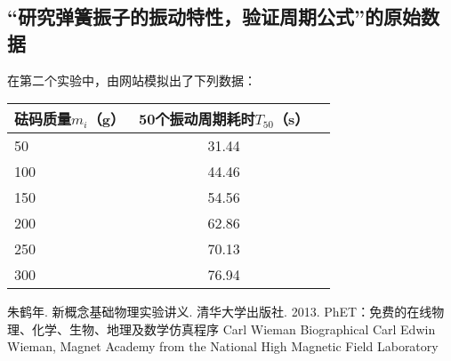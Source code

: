 \documentclass[UTF8]{ctexart}
\begin{document}
\subsection{“研究弹簧振子的振动特性，验证周期公式”的原始数据}
在第二个实验中，由网站模拟出了下列数据：
\begin{table}[htbp!] 
\centering 
\begin{tabular}{|l|c|r|} 
\hline 
 砝码质量$m_i$（g） &  50个振动周期耗时$T_{50}$（s）  \\ 
\hline 
 50 & 31.44 \\ 
\hline 
 100 & 44.46 \\ 
\hline 
 150 & 54.56  \\ 
\hline 
 200 & 62.86  \\ 
\hline 
 250 & 70.13 \\ 
\hline 
 300 & 76.94  \\ 
\hline
\end{tabular} 
\end{table}
\begin{thebibliography}{123456} 
 朱鹤年. 新概念基础物理实验讲义. 清华大学出版社. 2013. 
 PhET：免费的在线物理、化学、生物、地理及数学仿真程序
 Carl Wieman Biographical
 Carl Edwin Wieman, Magnet Academy from the National High Magnetic Field Laboratory 
\end{thebibliography}
\end{document}
